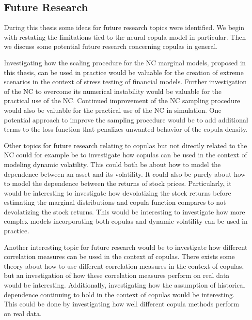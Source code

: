 \subsection{Future Research}
During this thesis some ideas for future research topics were identified. We begin with restating the limitations tied to the neural copula model in particular. Then we discuss some potential future research concerning copulas in general.

Investigating how the scaling procedure for the \gls{NC} marginal models, proposed in this thesis, can be used in practice would be valuable for the creation of extreme scenarios in the context of stress testing of financial models. Further investigation of the \gls{NC} to overcome its numerical instability would be valuable for the practical use of the \gls{NC}. Continued improvement of the \gls{NC} sampling procedure would also be valuable for the practical use of the \gls{NC} in simulation. One potential approach to improve the sampling procedure would be to add additional terms to the loss function that penalizes unwanted behavior of the copula density. 

Other topics for future research relating to copulas but not directly related to the \gls{NC} could for example be to investigate how copulas can be used in the context of modeling dynamic volatility.  This could both be about how to model the dependence between an asset and its volatility. It could also be purely about how to model the dependence between the returns of stock prices. Particularly, it would be interesting to investigate how devolatizing the stock returns before estimating the marginal distributions and copula function compares to not devolatizing the stock returns. This would be interesting to investigate how more complex models incorporating both copulas and dynamic volatility can be used in practice. 

Another interesting topic for future research would be to investigate how different correlation measures can be used in the context of copulas. There exists some theory about how to use different correlation measures in the context of copulas, but an investigation of how these correlation measures perform on real data would be interesting. Additionally, investigating how the assumption of historical dependence continuing to hold in the context of copulas would be interesting. This could be done by investigating how well different copula methods perform on real data. 

